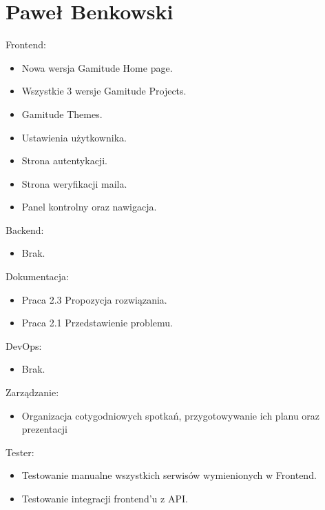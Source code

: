 \documentclass[a4paper,11pt]{report}
\begin{document}
\section {Paweł Benkowski}
Frontend:
\begin{itemize}
	\item Nowa wersja Gamitude Home page.
	\item Wszystkie 3 wersje Gamitude Projects.
	\item Gamitude Themes.
	\item Ustawienia użytkownika.
	\item Strona autentykacji.
	\item Strona weryfikacji maila.
	\item Panel kontrolny oraz nawigacja.
\end{itemize}
Backend:
\begin{itemize}
	\item Brak.
\end{itemize}
Dokumentacja:
\begin{itemize}
	\item Praca 2.3 Propozycja rozwiązania.
	\item Praca 2.1 Przedstawienie problemu.
\end{itemize}
DevOps:
\begin{itemize}
	\item Brak.
\end{itemize}
Zarządzanie:
\begin{itemize}
	\item Organizacja cotygodniowych spotkań, przygotowywanie ich planu oraz prezentacji
\end{itemize}
Tester:
\begin{itemize}
	\item Testowanie manualne wszystkich serwisów wymienionych w Frontend.
	\item Testowanie integracji frontend'u z API.
\end{itemize}
\end{document}
